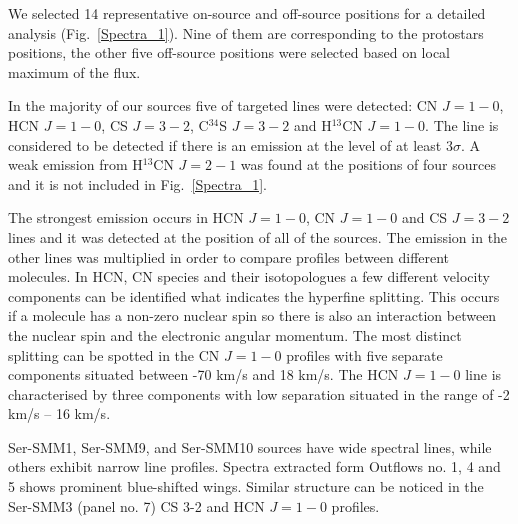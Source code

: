 \documentclass{aa}
\begin{document}
We selected 14 representative on-source and off-source positions for a detailed analysis (Fig.~\ref{Spectra_1}). Nine of them are corresponding to the protostars positions, the other five off-source positions were selected based on local maximum of the flux.   

In the majority of our sources five of targeted lines were detected: CN $J=1-0$, HCN $J=1-0$, CS $J=3-2$, C$^{34}$S $J=3-2$ and H$^{13}$CN $J=1-0$. The line is considered to be detected if there is an emission at the level of at least 3$\sigma$. A weak emission from H$^{13}$CN $J=2-1$ was found at the positions of four sources and it is not included in Fig.~\ref{Spectra_1}. 

The strongest emission occurs in HCN $J=1-0$, CN $J=1-0$ and CS $J=3-2$ lines and it was detected at the position of all of the sources. The emission in the other lines was multiplied in order to compare profiles between different molecules. In HCN, CN species and their isotopologues a few different velocity components can be identified what indicates the hyperfine splitting. This occurs if a molecule has a non-zero nuclear spin so there is also an interaction between the nuclear spin and the electronic angular momentum. The most distinct splitting can be spotted in the CN $J=1-0$ profiles with five separate components situated between -70 km/s and 18 km/s. The HCN $J=1-0$ line is characterised by three components with low separation situated in the range of -2 km/s – 16 km/s. 

Ser-SMM1, Ser-SMM9, and Ser-SMM10 sources have wide spectral lines, while others exhibit narrow line profiles. Spectra extracted form Outflows no. 1, 4 and 5 shows prominent blue-shifted wings. Similar structure can be noticed in the Ser-SMM3 (panel no. 7) CS 3-2 and HCN $J=1-0$ profiles. 
\end{document}
